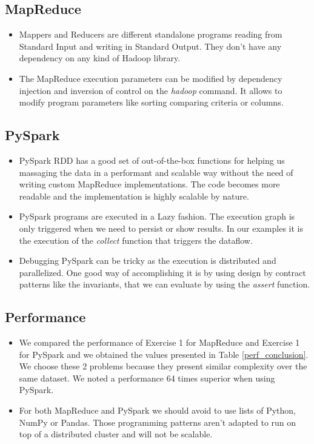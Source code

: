 \documentclass[conference,compsoc]{IEEEtran}
\begin{document}
\subsection{MapReduce}
\begin{itemize}
\item Mappers and Reducers are different standalone programs reading from Standard Input and writing in Standard Output. They don't have any dependency on any kind of Hadoop library.
\item The MapReduce execution parameters can be modified by dependency injection and inversion of control on the \textit{hadoop} command. It allows to modify program parameters like sorting comparing criteria or columns.
\end{itemize}
\subsection{PySpark}
\begin{itemize}
\item PySpark RDD has a good set of out-of-the-box functions for helping us massaging the data in a performant and scalable way without the need of writing custom MapReduce implementations. The code becomes more readable and the implementation is highly scalable by nature.
\item PySpark programs are executed in a Lazy fashion. The execution graph is only triggered when we need to persist or show results. In our examples it is the execution of the \textit{collect} function that triggers the dataflow.
\item Debugging PySpark can be tricky as the execution is distributed and parallelized. One good way of accomplishing it is by using design by contract patterns like the invariants, that we can evaluate by using the \textit{assert} function.
\end{itemize}

\subsection{Performance}
\begin{itemize}
\item We compared the performance of Exercise 1 for MapReduce and Exercise 1 for PySpark and we obtained the values presented in Table \ref{perf_conclusion}. We choose these 2 problems because they present similar complexity over the same dataset. We noted a performance 64 times superior when using PySpark. \par
\item For both MapReduce and PySpark we should avoid to use lists of Python, NumPy or Pandas. Those programming patterns aren't adapted to run on top of a distributed cluster and will not be scalable.
\end{itemize}
\end{document}

